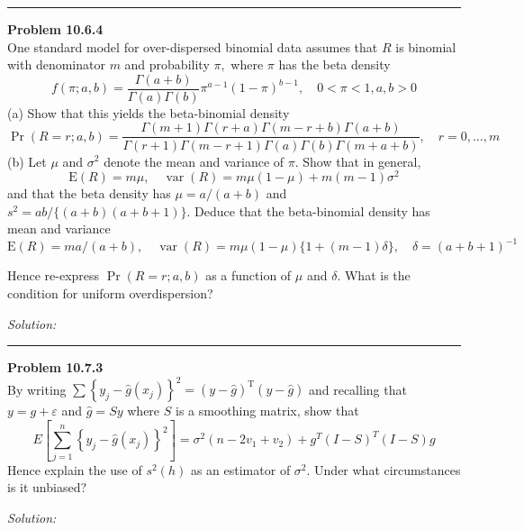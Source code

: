 \documentclass[a4paper, 11pt]{article}
\newenvironment{problem}[2][Problem]
    { \begin{mdframed}[backgroundcolor=gray!20] \textbf{#1 #2} \\}
    {  \end{mdframed}}
\newenvironment{solution}
    {\textit{Solution:}}
    {}
\begin{document}
\noindent\rule{7in}{2.8pt}
\begin{problem}{10.6.4}
 One standard model for over-dispersed binomial data assumes that $R$ is binomial with denominator $m$ and probability $\pi,$ where $\pi$ has the beta density
\[
f(\pi ; a, b)=\frac{\Gamma(a+b)}{\Gamma(a) \Gamma(b)} \pi^{a-1}(1-\pi)^{b-1}, \quad 0<\pi<1, a, b>0
\]
(a) Show that this yields the beta-binomial density
\[
\operatorname{Pr}(R=r ; a, b)=\frac{\Gamma(m+1) \Gamma(r+a) \Gamma(m-r+b) \Gamma(a+b)}{\Gamma(r+1) \Gamma(m-r+1) \Gamma(a) \Gamma(b) \Gamma(m+a+b)}, \quad r=0, \ldots, m
\]
(b) Let $\mu$ and $\sigma^{2}$ denote the mean and variance of $\pi$. Show that in general,
\[
\mathrm{E}(R)=m \mu, \quad \operatorname{var}(R)=m \mu(1-\mu)+m(m-1) \sigma^{2}
\]
and that the beta density has $\mu=a /(a+b)$ and $s^{2}=a b /\{(a+b)(a+b+1)\} .$ Deduce that the beta-binomial density has mean and variance
\[
\mathrm{E}(R)=m a /(a+b), \quad \operatorname{var}(R)=m \mu(1-\mu)\{1+(m-1) \delta\}, \quad \delta=(a+b+1)^{-1}
\]

Hence re-express $\operatorname{Pr}(R=r ; a, b)$ as a function of $\mu$ and $\delta$. What is the condition for uniform overdispersion?

\end{problem}
\begin{solution}



\end{solution}

\noindent\rule{7in}{2.8pt}
\begin{problem}{10.7.3}
 By writing $\sum\left\{y_{j}-\widehat{g}\left(x_{j}\right)\right\}^{2}=(y-\hat{g})^{\mathrm{T}}(y-\hat{g})$ and recalling that $y=g+\varepsilon$ and $\widehat{g}=S y$
where $S$ is a smoothing matrix, show that
\[
E\left[\sum_{j=1}^{n}\left\{y_{j}-\widehat{g}\left(x_{j}\right)\right\}^{2}\right]=\sigma^{2}\left(n-2 v_{1}+v_{2}\right)+g^{T}(I-S)^{T}(I-S) g
\]
Hence explain the use of $s^{2}(h)$ as an estimator of $\sigma^{2}$. Under what circumstances is it unbiased?

\end{problem}
\begin{solution}



\end{solution}
\end{document}
